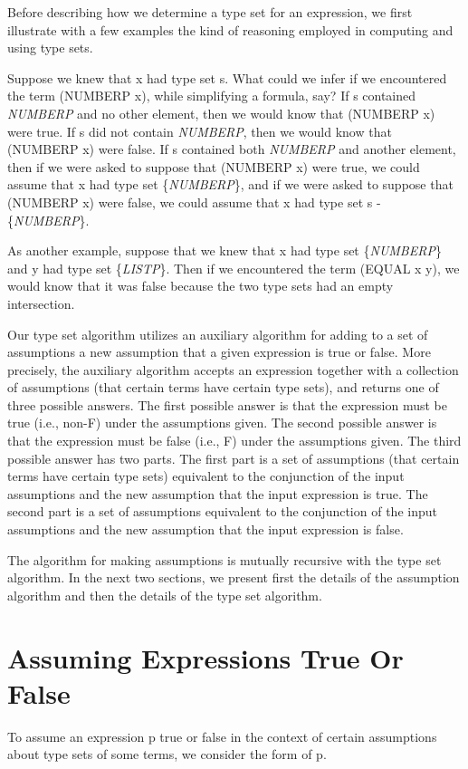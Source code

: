 \documentclass[10pt]{book}
\begin{document}
Before describing how we determine a type set for an expression, we first illustrate with a
few examples the kind of reasoning employed in computing 
and using type sets.

Suppose we knew that x had type set s.  What could we
infer if we encountered the term (NUMBERP x), while simplifying a formula,
say?  If s contained \emph{NUMBERP} and no other element,
then we would know that (NUMBERP x) were true.  If s
did not contain \emph{NUMBERP}, then we would know that
(NUMBERP x) were false.  If s contained both \emph{NUMBERP}
and another element, then if we were asked to suppose that
(NUMBERP x) were true, we could assume that x had type set \{\emph{NUMBERP}\},
and if we were asked to
suppose that (NUMBERP x) were false, we could assume
that x had type set s - \{\emph{NUMBERP}\}.

As another example, suppose that we knew that x had
type set \{\emph{NUMBERP}\} and y had type set
\{\emph{LISTP}\}.  Then if we encountered the
term (EQUAL x y), we would know that it
was false because the two type sets had
an empty intersection.

Our type set algorithm utilizes an auxiliary algorithm
for adding to a set of assumptions
a new assumption that a given expression is true or false.
More precisely, the auxiliary algorithm accepts an
expression together with a collection of assumptions
(that certain terms have certain type sets), and
returns one of three possible answers.  The first possible answer
is that the expression must be true (i.e., non-F) under the
assumptions given.  The second possible answer is that
the expression must be false (i.e., F) under the assumptions given.
The third possible answer has two parts.  The first
part is a set of assumptions (that certain terms have
certain type sets) equivalent to the conjunction of the input assumptions
and the new assumption that the input expression
is true.  The second part is a set of assumptions
equivalent to the conjunction of the input assumptions and the new assumption that
the input expression is false.

The algorithm for making assumptions is mutually
recursive with the type set algorithm.  In the
next two sections, we present first the details of the
assumption algorithm and then the details of the
type set algorithm.

\section{Assuming Expressions True Or False}
To assume an expression
p true or false in the context of certain assumptions
about type sets of some terms,  we consider the
form of p.
\end{document}
